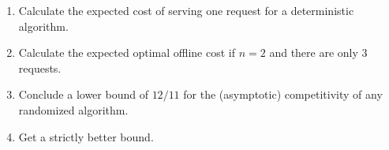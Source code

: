\documentclass[11pt, spanish]{article}
\theoremstyle{plain}
\begin{document}
\begin{itemize}
	\begin{enumerate}
	  \item Calculate the expected cost of serving one request
	    for a deterministic algorithm.
	  \item Calculate the expected optimal offline cost if $n=2$ and
	    there are only 3 requests.
	  \item Conclude a lower bound of $12/11$ for the (asymptotic) 
	    competitivity of any randomized algorithm. 
	  \item Get a strictly better bound.

	\end{enumerate}




\end{itemize}
\end{document}
